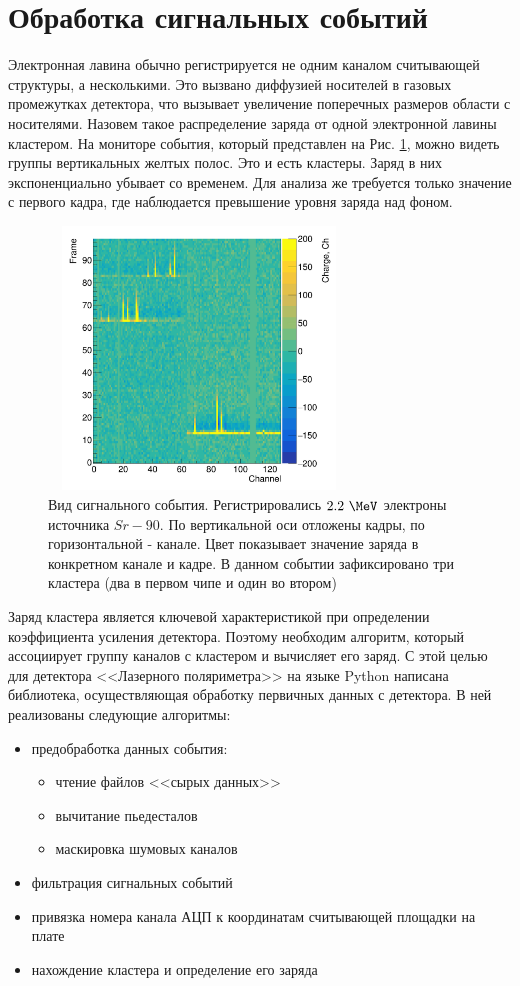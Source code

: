 \section{Обработка сигнальных событий}
Электронная лавина обычно регистрируется не одним каналом считывающей структуры, а несколькими. Это вызвано диффузией носителей в газовых промежутках детектора, что вызывает увеличение поперечных размеров области с носителями. Назовем такое распределение заряда от одной электронной лавины кластером. На мониторе события, который представлен на Рис. \ref{event_map}, можно видеть группы вертикальных желтых полос. Это и есть кластеры. Заряд в них экспоненциально убывает со временем. Для анализа же требуется только значение с первого кадра, где наблюдается превышение уровня заряда над фоном.   
\begin{figure}[H]
	\begin{center}
		\includegraphics[width = 8cm, height = 7cm]{img/Signal.png}
		\caption{Вид сигнального события. Регистрировались $2.2~\MeV$ электроны источника $Sr-90$. По вертикальной оси отложены кадры, по горизонтальной - канале. Цвет показывает значение заряда в конкретном канале и кадре. В данном событии зафиксировано три кластера (два в первом чипе и один во втором)}
		\label{event_map}
	\end{center}
\end{figure}%
 Заряд кластера является ключевой характеристикой при определении коэффициента усиления детектора. Поэтому необходим алгоритм, который ассоциирует группу каналов с кластером и вычисляет его заряд. С этой целью для детектора <<Лазерного поляриметра>> на языке Python написана библиотека, осуществляющая обработку первичных данных с детектора. В ней реализованы следующие алгоритмы:
 \begin{itemize}
 	\item предобработка данных события:
 	\begin{itemize}[label=$\circ$]
 		\item чтение файлов <<сырых данных>>
 		\item вычитание пьедесталов
 		\item маскировка шумовых каналов
 	\end{itemize}
 	\item фильтрация сигнальных событий
 	\item привязка номера канала АЦП к координатам считывающей площадки на плате
 	\item нахождение кластера и определение его заряда
 \end{itemize}

